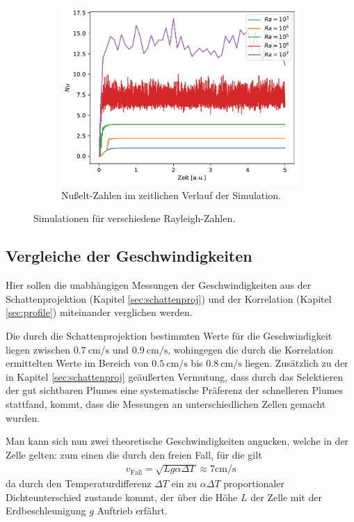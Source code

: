 \documentclass[12pt,a4paper,titlepage,headinclude]{scrartcl}
\numberwithin{equation}{subsection}
\begin{document}
\begin{figure}[!ht]
    ~
    \begin{subfigure}[t]{0.5\textwidth}
	\centering
	\includegraphics[width=1\textwidth]{Nu_sim}
	\caption{Nußelt-Zahlen im zeitlichen Verlauf der Simulation.}
	\label{fig:nu_num}
    \end{subfigure}
    \caption{Simulationen für verschiedene Rayleigh-Zahlen.}
    \label{fig:simulation}
\end{figure}




\subsection{Vergleiche der Geschwindigkeiten}
\label{sec:geschwindig}
Hier sollen die unabhängigen Messungen der Geschwindigkeiten aus der Schattenprojektion (Kapitel \ref{sec:schattenproj}) und der Korrelation (Kapitel \ref{sec:profile}) miteinander verglichen werden.

Die durch die Schattenprojektion bestimmten Werte für die Geschwindigkeit liegen zwischen $\SI{0.7}{\centi\meter\per\second}$ und $\SI{0.9}{\centi\meter\per\second}$, wohingegen die durch die Korrelation ermittelten Werte im Bereich von $\SI{0.5}{\centi\meter\per\second}$ bis $\SI{0.8}{\centi\meter\per\second}$ liegen.
Zusätzlich zu der in Kapitel \ref{sec:schattenproj} geäußerten Vermutung, dass durch das Selektieren der gut sichtbaren Plumes eine systematische Präferenz der schnelleren Plumes stattfand, kommt, dass die Messungen an unterschiedlichen Zellen gemacht wurden.



Man kann sich nun zwei theoretische Geschwindigkeiten angucken, welche in der Zelle gelten: zum einen die durch den freien Fall, für die gilt
\begin{align*}
	v_\text{Fall}=\sqrt{Lg\alpha\Delta T}\approx7\si{\centi\meter\per\second}
	\label{eq:fall}
\end{align*}
da durch den Temperaturdifferenz $\Delta T$ ein zu $\alpha\Delta T$ proportionaler Dichteunterschied zustande kommt, der über die Höhe $L$ der Zelle mit der Erdbeschleunigung $g$ Auftrieb erfährt.
\end{document}
